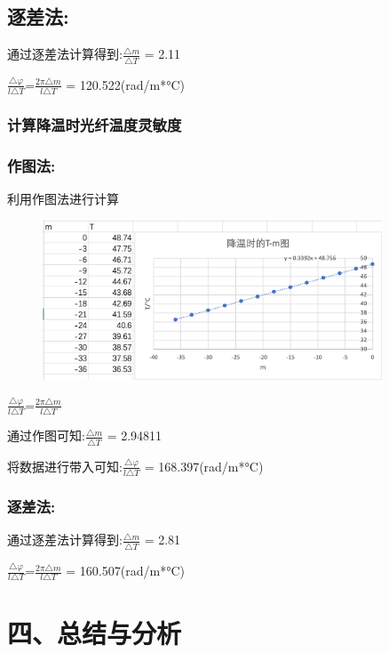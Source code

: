 \documentclass{article}
\begin{document}
\subsection*{逐差法:}
通过逐差法计算得到:$\frac{\triangle{m}}{\triangle{T}}$ = 2.11

$\frac{\triangle\varphi}{l\triangle{T}}$=$\frac{2\pi\triangle{m}}{l\triangle{T}}$ = 120.522(rad/m*°C)

\subsubsection*{计算降温时光纤温度灵敏度}
\subsubsection*{作图法:}
利用作图法进行计算
\begin{figure}[H]
    \centering
    \includegraphics[width=0.9\textwidth]{p2.png}
    \end{figure}

    $\frac{\triangle\varphi}{l\triangle{T}}$=$\frac{2\pi\triangle{m}}{l\triangle{T}}$

    通过作图可知:$\frac{\triangle{m}}{\triangle{T}}$ = 2.94811
    
    将数据进行带入可知:$\frac{\triangle\varphi}{l\triangle{T}}$ = 168.397(rad/m*°C)
    
\subsubsection*{逐差法:}
通过逐差法计算得到:$\frac{\triangle{m}}{\triangle{T}}$ = 2.81

$\frac{\triangle\varphi}{l\triangle{T}}$=$\frac{2\pi\triangle{m}}{l\triangle{T}}$ = 160.507(rad/m*°C)

\section*{四、总结与分析}
\end{document}

